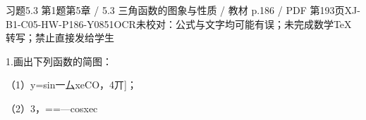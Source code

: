 \begin{bankitem}{习题5.3 第1题}{第5章 / 5.3 三角函数的图象与性质 / 教材 p.186 / PDF 第193页}{XJ-B1-C05-HW-P186-Y0851}{OCR未校对：公式与文字均可能有误；未完成数学TeX转写；禁止直接发给学生}
\begin{ocrdraft}
\par
1.画出下列函数的简图：
\par
（1）y=sin一厶xeCO，4丌]；
\par
（2）3，==—cosxec
\end{ocrdraft}
\end{bankitem}
